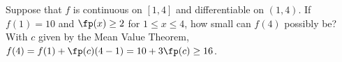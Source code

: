 {Suppose that $f$ is continuous on $[1,4]$ and differentiable on $(1,4)$. If $f(1)=10$ and $\fp(x)\ge2$ for $1\le x\le 4$, how small can $f(4)$ possibly be?}
{With $c$ given by the Mean Value Theorem, $f(4)=f(1)+\fp(c)(4-1)=10+3\fp(c)\ge 16$.}
